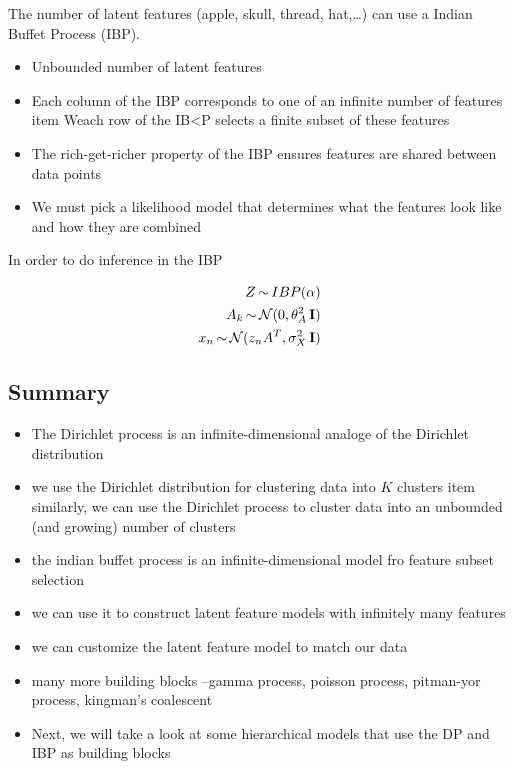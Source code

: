 \documentclass[b5paper]{report}
\begin{document}
The number of latent features (apple, skull, thread, hat,\dots) can use a
Indian Buffet Process (IBP).

\begin{itemize}
  \item Unbounded number of latent features
  \item Each column of the IBP corresponds to one of an infinite number of
    features
  item Weach row of the IB<P selects a finite subset of these features
  \item The rich-get-richer property of the IBP ensures features are shared
  between data points
  \item We must pick a likelihood model that determines what the features look
    like and how they are combined
\end{itemize}

In order to do inference in the IBP

\begin{align}
  Z \operatorname*{\sim} IBP(\alpha) \\
  A_k \operatorname*{\sim} \operatorname*{\mathcal{N}}(0, \theta_A^2 \operatorname*{\mathbf{I}}) \\
  x_n \operatorname*{\sim} \operatorname*{\mathcal{N}}(z_nA^T, \sigma_X^2\operatorname*{\mathbf{I}})
\end{align}

\subsection{Summary}

\begin{itemize}
  \item The Dirichlet process is an infinite-dimensional analoge of the
    Dirichlet distribution
  \item we use the Dirichlet distribution for clustering data into $K$ clusters
  item similarly, we can use the Dirichlet process to cluster data into an
  unbounded (and growing) number of clusters
\item the indian buffet process is an infinite-dimensional model fro feature
  subset selection
\item we can use it to construct latent feature models with infinitely many
  features
\item we can customize the latent feature model to match our data
\item many more building blocks --gamma process, poisson process, pitman-yor
  process, kingman's coalescent
\item Next, we will take a look at some hierarchical models that use the DP and
  IBP as building blocks
\end{itemize}
\end{document}
